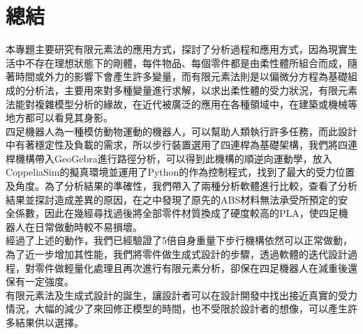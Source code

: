 \chapter{總結}
本專題主要研究有限元素法的應用方式，探討了分析過程和應用方式，因為現實生活中不存在理想狀態下的剛體，每件物品、每個零件都是由柔性體所組合而成，隨著時間或外力的影響下會產生許多變量，而有限元素法則是以偏微分方程為基礎組成的分析法，主要用來對多種變量進行求解，以求出柔性體的受力狀況，有限元素法能對複雜模型分析的緣故，在近代被廣泛的應用在各種領域中，在建築或機械等地方都可以看見其身影。\\

四足機器人為一種模仿動物運動的機器人，可以幫助人類執行許多任務，而此設計中有著穩定性及負載的需求，所以步行裝置選用了四連桿為基礎架構，我們將四連桿機構帶入GeoGebra進行路徑分析，可以得到此機構的順逆向運動學，放入CoppeliaSim的擬真環境並運用了Python的作為控制程式，找到了最大的受力位置及角度。為了分析結果的準確性，我們帶入了兩種分析軟體進行比較，查看了分析結果並探討造成差異的原因，在之中發現了原先的ABS材料無法承受所預定的安全係數，因此在幾經尋找過後將全部零件材質換成了硬度較高的PLA，使四足機器人在日常做動時較不易損壞。\\

經過了上述的動作，我們已經驗證了5倍自身重量下步行機構依然可以正常做動，為了近一步增加其性能，我們將零件做生成式設計的步驟，透過軟體的迭代設計過程，對零件做輕量化處理且再次進行有限元素分析，卻保在四足機器人在減重後還保有一定強度。\\

有限元素法及生成式設計的誕生，讓設計者可以在設計開發中找出接近真實的受力情況，大幅的減少了來回修正模型的時間，也不受限於設計者的想像，可以產生許多結果供以選擇。\
\newpage


